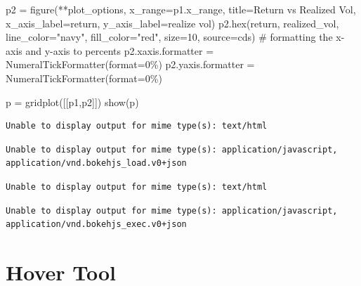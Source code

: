 \documentclass[
  letterpaper,
  DIV=11,
  numbers=noendperiod]{scrreprt}
\newenvironment{Shaded}{\begin{snugshade}}{\end{snugshade}}
\newcommand{\BuiltInTok}[1]{\textcolor[rgb]{0.00,0.23,0.31}{#1}}
\newcommand{\CommentTok}[1]{\textcolor[rgb]{0.37,0.37,0.37}{#1}}
\newcommand{\DecValTok}[1]{\textcolor[rgb]{0.68,0.00,0.00}{#1}}
\newcommand{\NormalTok}[1]{\textcolor[rgb]{0.00,0.23,0.31}{#1}}
\newcommand{\OperatorTok}[1]{\textcolor[rgb]{0.37,0.37,0.37}{#1}}
\newcommand{\StringTok}[1]{\textcolor[rgb]{0.13,0.47,0.30}{#1}}
\begin{document}
\begin{Shaded}
\begin{Highlighting}[]
\NormalTok{p2 }\OperatorTok{=}\NormalTok{ figure(}\OperatorTok{**}\NormalTok{plot\_options, x\_range}\OperatorTok{=}\NormalTok{p1.x\_range, title}\OperatorTok{=}\StringTok{\textquotesingle{}Return vs Realized Vol\textquotesingle{}}\NormalTok{,}
\NormalTok{            x\_axis\_label}\OperatorTok{=}\StringTok{\textquotesingle{}return\textquotesingle{}}\NormalTok{, y\_axis\_label}\OperatorTok{=}\StringTok{\textquotesingle{}realize vol\textquotesingle{}}\NormalTok{)}
\NormalTok{p2.}\BuiltInTok{hex}\NormalTok{(}\StringTok{\textquotesingle{}return\textquotesingle{}}\NormalTok{, }\StringTok{\textquotesingle{}realized\_vol\textquotesingle{}}\NormalTok{, line\_color}\OperatorTok{=}\StringTok{"navy"}\NormalTok{, fill\_color}\OperatorTok{=}\StringTok{"red"}\NormalTok{, size}\OperatorTok{=}\DecValTok{10}\NormalTok{, source}\OperatorTok{=}\NormalTok{cds)}
\CommentTok{\# formatting the x{-}axis and y{-}axis to percents}
\NormalTok{p2.xaxis.formatter }\OperatorTok{=}\NormalTok{ NumeralTickFormatter(}\BuiltInTok{format}\OperatorTok{=}\StringTok{\textquotesingle{}0\%\textquotesingle{}}\NormalTok{) }
\NormalTok{p2.yaxis.formatter }\OperatorTok{=}\NormalTok{ NumeralTickFormatter(}\BuiltInTok{format}\OperatorTok{=}\StringTok{\textquotesingle{}0\%\textquotesingle{}}\NormalTok{)}

\NormalTok{p }\OperatorTok{=}\NormalTok{ gridplot([[p1,p2]])}
\NormalTok{show(p)}
\end{Highlighting}
\end{Shaded}

\begin{verbatim}
Unable to display output for mime type(s): text/html
\end{verbatim}

\begin{verbatim}
Unable to display output for mime type(s): application/javascript, application/vnd.bokehjs_load.v0+json
\end{verbatim}

\begin{verbatim}
Unable to display output for mime type(s): text/html
\end{verbatim}

\begin{verbatim}
Unable to display output for mime type(s): application/javascript, application/vnd.bokehjs_exec.v0+json
\end{verbatim}

\hypertarget{hover-tool}{%
\section{Hover Tool}\label{hover-tool}}
\end{document}
